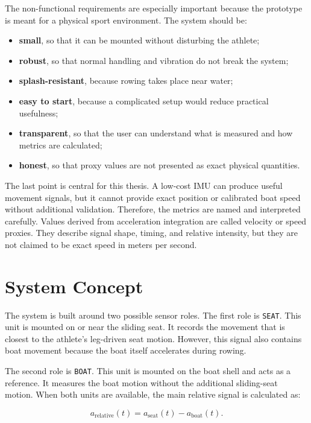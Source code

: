 The non-functional requirements are especially important because the prototype is meant for a physical sport environment. The system should be:

\begin{itemize}
  \item \textbf{small}, so that it can be mounted without disturbing the athlete;
  \item \textbf{robust}, so that normal handling and vibration do not break the system;
  \item \textbf{splash-resistant}, because rowing takes place near water;
  \item \textbf{easy to start}, because a complicated setup would reduce practical usefulness;
  \item \textbf{transparent}, so that the user can understand what is measured and how metrics are calculated;
  \item \textbf{honest}, so that proxy values are not presented as exact physical quantities.
\end{itemize}

The last point is central for this thesis. A low-cost IMU can produce useful movement signals, but it cannot provide exact position or calibrated boat speed without additional validation. Therefore, the metrics are named and interpreted carefully. Values derived from acceleration integration are called velocity or speed proxies. They describe signal shape, timing, and relative intensity, but they are not claimed to be exact speed in meters per second.

\section{System Concept}

The system is built around two possible sensor roles. The first role is \texttt{SEAT}. This unit is mounted on or near the sliding seat. It records the movement that is closest to the athlete's leg-driven seat motion. However, this signal also contains boat movement because the boat itself accelerates during rowing.

The second role is \texttt{BOAT}. This unit is mounted on the boat shell and acts as a reference. It measures the boat motion without the additional sliding-seat motion. When both units are available, the main relative signal is calculated as:

\begin{equation}
  a_{\text{relative}}(t) = a_{\text{seat}}(t) - a_{\text{boat}}(t).
\end{equation}

